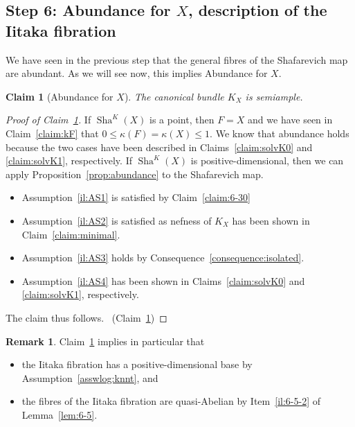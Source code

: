 \documentclass[JEP,XML,SOM,Unicode,published]{cedram}
\theoremstyle{plain}
\newtheorem{claim}[thm]{Claim}
\theoremstyle{definition}
\newtheorem{rem}[thm]{Remark}
\numberwithin{equation}{thm}
\numberwithin{enumi}{thm}
\DeclareMathOperator{\Sh}{Sha}
\begin{document}
\subsection*{Step 6: Abundance for $X$, description of the Iitaka fibration}

We have seen in the previous step that the general fibres of the Shafarevich map
are abundant. As we will see now, this implies Abundance for $X$.

\begin{claim}[Abundance for $X$]\label{claim:AbdX}
The canonical bundle $K_X$ is semiample.
\end{claim}
\begin{proof}[Proof of Claim~\ref{claim:AbdX}]
If $\Sh^K(X)$ is a point, then $F = X$ and we have seen in
Claim~\ref{claim:kF} that $0 \leq \kappa(F) = \kappa(X) \leq 1$. We know that abundance holds
because the two cases have been described in Claims~\ref{claim:solvK0} and
\ref{claim:solvK1}, respectively. If $\Sh^K(X)$ is positive-dimensional, then
we can apply Proposition~\ref{prop:abundance} to the Shafarevich map.
\begin{itemize}
\item Assumption~\ref{il:AS1} is satisfied by Claim~\ref{claim:6-30}

\item Assumption~\ref{il:AS2} is satisfied as nefness of $K_X$ has been shown
in Claim~\ref{claim:minimal}.

\item Assumption~\ref{il:AS3} holds by Consequence~\ref{consequence:isolated}.

\item Assumption~\ref{il:AS4} has been shown in Claims~\ref{claim:solvK0} and
\ref{claim:solvK1}, respectively.
\end{itemize}
The claim thus follows. \qedhere~\mbox{(Claim~\ref{claim:AbdX})}
\end{proof}

\begin{rem}
Claim~\ref{claim:AbdX} implies in particular that
\begin{itemize}
\item the Iitaka fibration has a positive-dimensional base by
Assumption~\ref{asswlog:knnt}, and

\item the fibres of the Iitaka fibration are quasi-Abelian by
Item~\ref{il:6-5-2} of Lemma~\ref{lem:6-5}.
\end{itemize}
\end{rem}
\end{document}
